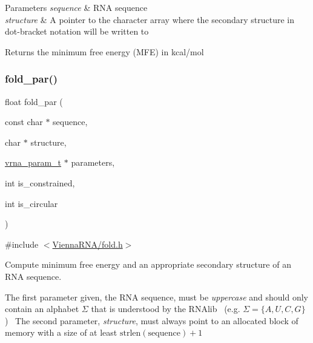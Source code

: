 \begin{DoxyParams}{Parameters}
{\em sequence} & R\+NA sequence \\
\hline
{\em structure} & A pointer to the character array where the secondary structure in dot-\/bracket notation will be written to \\
\hline
\end{DoxyParams}
\begin{DoxyReturn}{Returns}
the minimum free energy (M\+FE) in kcal/mol 
\end{DoxyReturn}
\mbox{\label{group__mfe__fold__single_ga2bc41df5d71fee6fd8da9904ee65d8fb}} 
\subsubsection{\texorpdfstring{fold\+\_\+par()}{fold\_par()}}
{\footnotesize\ttfamily float fold\+\_\+par (\begin{DoxyParamCaption}\item[{const char $\ast$}]{sequence,  }\item[{char $\ast$}]{structure,  }\item[{\hyperlink{group__energy__parameters_ga8a69ca7d787e4fd6079914f5343a1f35}{vrna\+\_\+param\+\_\+t} $\ast$}]{parameters,  }\item[{int}]{is\+\_\+constrained,  }\item[{int}]{is\+\_\+circular }\end{DoxyParamCaption})}



{\ttfamily \#include $<$\hyperlink{fold_8h}{Vienna\+R\+N\+A/fold.\+h}$>$}



Compute minimum free energy and an appropriate secondary structure of an R\+NA sequence. 

The first parameter given, the R\+NA sequence, must be {\itshape uppercase} and should only contain an alphabet $\Sigma$ that is understood by the R\+N\+Alib~\newline
(e.\+g. $ \Sigma = \{A,U,C,G\} $)~\newline
 The second parameter, {\itshape structure}, must always point to an allocated block of memory with a size of at least $\mathrm{strlen}(\mathrm{sequence})+1$

